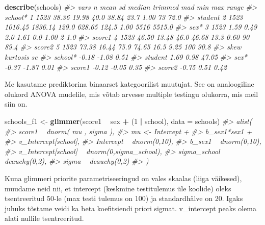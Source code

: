 \documentclass[]{book}
\newenvironment{Shaded}{\begin{snugshade}}{\end{snugshade}}
\newcommand{\CommentTok}[1]{\textcolor[rgb]{0.56,0.35,0.01}{\textit{#1}}}
\newcommand{\DataTypeTok}[1]{\textcolor[rgb]{0.13,0.29,0.53}{#1}}
\newcommand{\DecValTok}[1]{\textcolor[rgb]{0.00,0.00,0.81}{#1}}
\newcommand{\KeywordTok}[1]{\textcolor[rgb]{0.13,0.29,0.53}{\textbf{#1}}}
\newcommand{\NormalTok}[1]{#1}
\newcommand{\OperatorTok}[1]{\textcolor[rgb]{0.81,0.36,0.00}{\textbf{#1}}}
\newcommand{\StringTok}[1]{\textcolor[rgb]{0.31,0.60,0.02}{#1}}
\begin{document}
\begin{Shaded}
\begin{Highlighting}[]
\KeywordTok{describe}\NormalTok{(schools)}
\CommentTok{#>         vars    n    mean      sd median trimmed   mad  min  max  range}
\CommentTok{#> school*    1 1523   38.36   19.98   40.0   38.84  23.7 1.00   73   72.0}
\CommentTok{#> student    2 1523 1016.45 1836.14  129.0  628.65 124.5 1.00 5516 5515.0}
\CommentTok{#> sex*       3 1523    1.59    0.49    2.0    1.61   0.0 1.00    2    1.0}
\CommentTok{#> score1     4 1523   46.50   13.48   46.0   46.68  13.3 0.60   90   89.4}
\CommentTok{#> score2     5 1523   73.38   16.44   75.9   74.65  16.5 9.25  100   90.8}
\CommentTok{#>          skew kurtosis    se}
\CommentTok{#> school* -0.18    -1.08  0.51}
\CommentTok{#> student  1.69     0.98 47.05}
\CommentTok{#> sex*    -0.37    -1.87  0.01}
\CommentTok{#> score1  -0.12    -0.05  0.35}
\CommentTok{#> score2  -0.75     0.51  0.42}
\end{Highlighting}
\end{Shaded}

Me kasutame prediktorina binaarset kategoorilist muutujat. See on analoogiline olukord ANOVA mudelile, mis võtab arvesse multiple testingu olukorra, mis meil siin on.

\begin{Shaded}
\begin{Highlighting}[]
\NormalTok{schools_f1 <-}\StringTok{ }\KeywordTok{glimmer}\NormalTok{(score1 }\OperatorTok{~}\StringTok{ }\NormalTok{sex }\OperatorTok{+}\StringTok{ }\NormalTok{(}\DecValTok{1} \OperatorTok{|}\StringTok{ }\NormalTok{school), }\DataTypeTok{data =}\NormalTok{ schools)}
\CommentTok{#> alist(}
\CommentTok{#>     score1 ~ dnorm( mu , sigma ),}
\CommentTok{#>     mu <- Intercept +}
\CommentTok{#>         b_sex1*sex1 +}
\CommentTok{#>         v_Intercept[school],}
\CommentTok{#>     Intercept ~ dnorm(0,10),}
\CommentTok{#>     b_sex1 ~ dnorm(0,10),}
\CommentTok{#>     v_Intercept[school] ~ dnorm(0,sigma_school),}
\CommentTok{#>     sigma_school ~ dcauchy(0,2),}
\CommentTok{#>     sigma ~ dcauchy(0,2)}
\CommentTok{#> )}
\end{Highlighting}
\end{Shaded}

Kuna glimmeri priorite parametriseeringud on vales skaalas (liiga väikesed), muudame neid nii, et intercept (keskmine testitulemus üle koolide) oleks tsentreeritud 50-le (max testi tulemus on 100) ja standardhälve on 20. Igaks juhuks tõstame veidi ka beta koefitsiendi priori sigmat. v\_intercept peaks olema alati nullile tsentreeritud.
\end{document}
